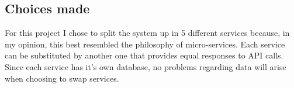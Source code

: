 \documentclass[12pt]{article}
\begin{document}
\subsection{Choices made}
For this project I chose to split the system up in 5 different services because, in my opinion, this best resembled the philosophy of micro-services. Each service can be substituted by another one that provides equal responses to API calls. \\
Since each service has it's own database, no problems regarding data will arise when choosing to swap services.

\end{document}

